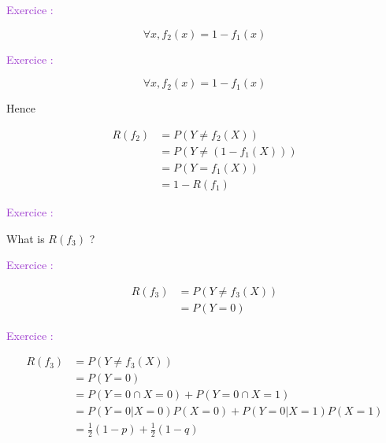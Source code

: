 \documentclass[usenames,dvipsnames]{beamer}
\newcounter{numexos}%
\newcommand{\exercice}[1]{%
\addtocounter{numexos}{1}%
\textcolor{DarkOrchid}{Exercice\,\thenumexos\,:}\,#1%
}
\begin{document}
\begin{frame}{}
    \exercice{} 
    \addtocounter{numexos}{-1}

    \begin{equation}
        \forall x, f_2(x) = 1-f_1(x)
    \end{equation}
\end{frame}

\begin{frame}{}
    \exercice{} 

    \begin{equation}
        \forall x, f_2(x) = 1-f_1(x)
    \end{equation}

    Hence

    \begin{equation}
        \begin{aligned}
            \label{eq:}
            R(f_2) &= P(Y\neq f_2(X))\\
            &= P(Y\neq (1-f_1(X)))\\
            &= P(Y=f_1(X))\\
            &= 1-R(f_1)
        \end{aligned}
    \end{equation}
\end{frame}


\begin{frame}{}
    \exercice{}
    \addtocounter{numexos}{-1}

    What is $R(f_3)$ ?

\end{frame}

\begin{frame}{}
    \exercice{}
    \addtocounter{numexos}{-1}
    \begin{equation}
        \begin{aligned}
            \label{eq:}
            R(f_3)&= P(Y\neq f_3(X))\\
            &= P(Y=0)
        \end{aligned}
    \end{equation}
\end{frame}

\begin{frame}{}
    \exercice{}
    \begin{equation}
        \begin{aligned}
            \label{eq:}
            R(f_3)&= P(Y\neq f_3(X))\\
            &= P(Y=0)\\
            &= P(Y=0\cap X=0)+P(Y=0\cap X=1)\\
            &= P(Y=0| X=0)P(X=0)+P(Y=0| X=1)P(X=1)\\
            &= \frac{1}{2} (1-p) + \frac{1}{2} (1-q)
        \end{aligned}
    \end{equation}
\end{frame}
\end{document}
